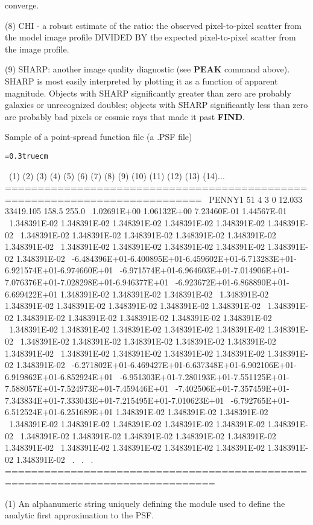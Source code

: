 converge.
\item{(8)} CHI - a robust estimate of the ratio:  the observed pixel-to-pixel
scatter from the model image profile DIVIDED BY the expected
pixel-to-pixel scatter from the image profile.
\item{(9)} SHARP:  another image quality diagnostic (see {\bf PEAK}
command above).
SHARP is most easily interpreted by plotting it as a function of apparent
magnitude.  Objects with SHARP significantly greater than zero are
probably galaxies or unrecognized doubles;  objects with SHARP
significantly less than zero are probably bad pixels or cosmic rays that
made it past {\bf FIND}.
\vfill
\eject
\centerline{Sample of a point-spread function file (a .PSF file)}
\bigskip
{\noindent\obeylines\obeyspaces\frenchspacing\tt\baselineskip=0.3truecm

\  (1)      (2)   (3)  (4)  (5)   (6)           (7)        (8)      (9)
       (10)         (11)         (12)          (13)
    (14)...
============================================================================
\ PENNY1     51    4    3    0   12.033      33419.105    158.5    255.0
\   1.02691E+00  1.06132E+00  7.23460E-01  1.44567E-01
\  1.348391E-02 1.348391E-02 1.348391E-02 1.348391E-02 1.348391E-02 1.348391E-02
\  1.348391E-02 1.348391E-02 1.348391E-02 1.348391E-02 1.348391E-02 1.348391E-02
\  1.348391E-02 1.348391E-02 1.348391E-02 1.348391E-02 1.348391E-02 1.348391E-02
\ -6.484396E+01-6.400895E+01-6.459602E+01-6.713283E+01-6.921574E+01-6.974660E+01
\ -6.971574E+01-6.964603E+01-7.014906E+01-7.076376E+01-7.028298E+01-6.946377E+01
\ -6.923672E+01-6.868890E+01-6.699422E+01 1.348391E-02 1.348391E-02 1.348391E-02
\  1.348391E-02 1.348391E-02 1.348391E-02 1.348391E-02 1.348391E-02 1.348391E-02
\  1.348391E-02 1.348391E-02 1.348391E-02 1.348391E-02 1.348391E-02 1.348391E-02
\  1.348391E-02 1.348391E-02 1.348391E-02 1.348391E-02 1.348391E-02 1.348391E-02
\  1.348391E-02 1.348391E-02 1.348391E-02 1.348391E-02 1.348391E-02 1.348391E-02
\  1.348391E-02 1.348391E-02 1.348391E-02 1.348391E-02 1.348391E-02 1.348391E-02
\ -6.271802E+01-6.469427E+01-6.637348E+01-6.902106E+01-6.919862E+01-6.852924E+01
\ -6.951303E+01-7.280193E+01-7.551125E+01-7.588057E+01-7.524973E+01-7.459446E+01
\ -7.402506E+01-7.357459E+01-7.343834E+01-7.333043E+01-7.215495E+01-7.010623E+01
\ -6.792765E+01-6.512524E+01-6.251689E+01 1.348391E-02 1.348391E-02 1.348391E-02
\  1.348391E-02 1.348391E-02 1.348391E-02 1.348391E-02 1.348391E-02 1.348391E-02
\  1.348391E-02 1.348391E-02 1.348391E-02 1.348391E-02 1.348391E-02 1.348391E-02
\  1.348391E-02 1.348391E-02 1.348391E-02 1.348391E-02 1.348391E-02 1.348391E-02
\                                        .
\                                        .
\                                        .
==============================================================================
}
\item{(1)}  An alphanumeric string uniquely defining the module used to define
the analytic first approximation to the PSF.

